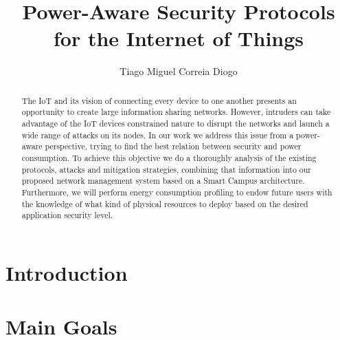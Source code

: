 \documentclass{llncs}
\begin{document}
\title{Power-Aware Security Protocols\\ for the Internet of Things}
%
\titlerunning{}  %
%
\author{Tiago Miguel Correia Diogo}
%
%
%

\maketitle              %

\begin{abstract}
The \ac{IoT} and its vision of connecting every device to one another presents an opportunity to create large information sharing networks. However, intruders can take advantage of the \ac{IoT} devices constrained nature to disrupt the networks and launch a wide range of attacks on its nodes. In our work we address this issue from a power-aware perspective, trying to find the best relation between security and power consumption. To achieve this objective we do a thoroughly analysis of the existing protocols, attacks and mitigation strategies, combining that information into our proposed network management system based on a Smart Campus architecture. Furthermore, we will perform energy consumption profiling to endow future users with the knowledge of what kind of physical resources to deploy based on the desired application security level.
\end{abstract}

\tableofcontents
\newpage

\section{Introduction}


\section{Main Goals}

\end{document}
